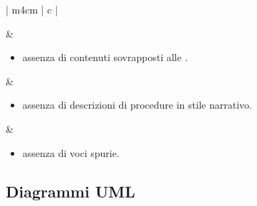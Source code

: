 \begin{longtable}{| m{4cm} | c |}
\begin{minipage}[c]{0.7\textwidth}
		\end{minipage}
	\hline
		\PianoQualifica{}
		&
		\begin{minipage}[c]{0.7\textwidth}
			\vspace{0.2cm}
			\begin{itemize}
				\item assenza di contenuti sovrapposti alle \NormeProgetto{}.
			\end{itemize}
			\vspace{0.2cm}
		\end{minipage}
	\hline
		\NormeProgetto{}
		&
		\begin{minipage}[c]{0.7\textwidth}
			\vspace{0.2cm}
			\begin{itemize}
				\item assenza di descrizioni di procedure in stile narrativo.
			\end{itemize}
			\vspace{0.2cm}
		\end{minipage}
	\hline
		\Glossario{}
		&
		\begin{minipage}[c]{0.7\textwidth}
			\vspace{0.2cm}
			\begin{itemize}
				\item assenza di voci spurie.
			\end{itemize}
			\vspace{0.2cm}
		\end{minipage}
    \hline
	\caption[Lista di controllo per i documenti]{Lista di controllo per i documenti}
	\end{longtable}

\newpage

\subsection{Diagrammi UML} \label{listeUML}


